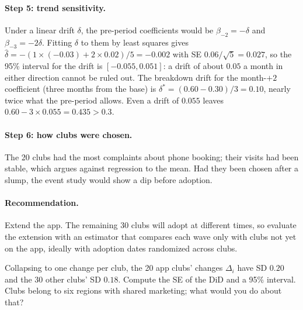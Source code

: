 \documentclass[11pt]{article}
\begin{document}
\paragraph{Step 5: trend sensitivity.} Under a linear drift $\delta$, the pre-period coefficients would be $\beta_{-2} = -\delta$ and $\beta_{-3} = -2\delta$.
Fitting $\delta$ to them by least squares gives $\hat\delta = -(1 \times (-0.03) + 2 \times 0.02)/5 = -0.002$ with SE $0.06/\sqrt5 = 0.027$, so the 95\% interval for the drift is
$[-0.055, 0.051]$: a drift of about $0.05$ a month in either direction cannot be ruled out. The breakdown drift for the month-$+2$ coefficient (three months from the base) is
$\delta^\ast = (0.60 - 0.30)/3 = 0.10$, nearly twice what the pre-period allows. Even a drift of $0.055$ leaves $0.60 - 3 \times 0.055 = 0.435 > 0.3$.

\paragraph{Step 6: how clubs were chosen.} The 20 clubs had the most complaints about phone booking; their visits had been stable, which argues
against regression to the mean. Had they been chosen after a slump, the event study would show a dip before adoption.

\paragraph{Recommendation.} Extend the app. The remaining 30 clubs will adopt at different times, so evaluate the extension with an estimator
that compares each wave only with clubs not yet on the app, ideally with adoption dates randomized across clubs.

\begin{exercise}[computation]
Collapsing to one change per club, the 20 app clubs' changes $\Delta_i$ have SD $0.20$ and the 30 other clubs' SD $0.18$. Compute the SE of the DiD and a
95\% interval. Clubs belong to six regions with shared marketing; what would you do about that?
\end{exercise}
\end{document}
